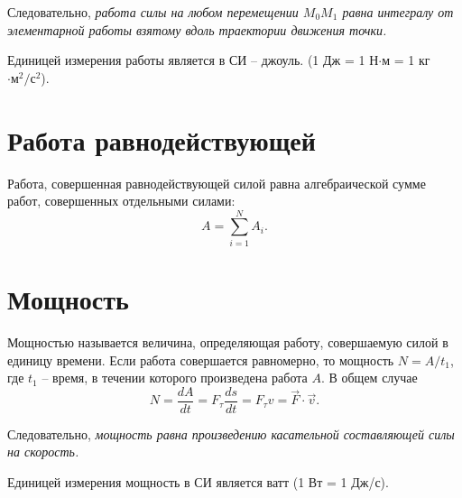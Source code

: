 Следовательно, \emph{работа силы на любом перемещении \( M_0 M_1 \) равна 
интегралу от элементарной работы взятому вдоль траектории движения точки.}

Единицей измерения работы является в СИ -- джоуль.
(1 Дж = 1 Н\( \cdot \)м = 1 кг\( \cdot\text{м}^2/\text{с}^2 \)).

\section{Работа равнодействующей}
Работа, совершенная равнодействующей силой равна алгебраической сумме 
работ, совершенных отдельными силами:
\[
    A = \sum_{i=1}^{N} A_i.
\]

\section{Мощность}
Мощностью называется величина, определяющая работу, совершаемую силой 
в единицу времени. Если работа совершается равномерно, то мощность 
\( N = A/t_1 \), где \( t_1 \) -- время, в течении которого произведена 
работа \( A \). В общем случае
\[
    N = \frac{dA}{dt} = F_\tau \frac{ds}{dt} = F_\tau v = \vec{F}\cdot\vec{v}.
\]

Следовательно, \emph{мощность равна произведению касательной 
составляющей силы на скорость.}

Единицей измерения мощность в СИ является ватт (1 Вт = 1 Дж/с).

\newpage
